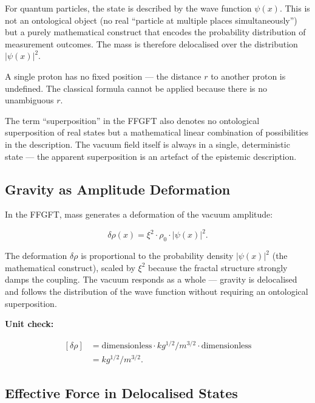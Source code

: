 	For quantum particles, the state is described by the wave function \(\psi(x)\). This is not an ontological object (no real “particle at multiple places simultaneously”) but a purely mathematical construct that encodes the probability distribution of measurement outcomes. The mass is therefore delocalised over the distribution \(|\psi(x)|^2\).
	
	A single proton has no fixed position — the distance \(r\) to another proton is undefined. The classical formula cannot be applied because there is no unambiguous \(r\).
	
	The term “superposition” in the FFGFT also denotes no ontological superposition of real states but a mathematical linear combination of possibilities in the description. The vacuum field itself is always in a single, deterministic state — the apparent superposition is an artefact of the epistemic description.
	
	\subsection*{Gravity as Amplitude Deformation}
	
	In the FFGFT, mass generates a deformation of the vacuum amplitude:
	
	\begin{equation}
		\delta \rho(x) = \xi^2 \cdot \rho_0 \cdot |\psi(x)|^2.
	\end{equation}
	
	The deformation \(\delta \rho\) is proportional to the probability density \(|\psi(x)|^2\) (the mathematical construct), scaled by \(\xi^2\) because the fractal structure strongly damps the coupling. The vacuum responds as a whole — gravity is delocalised and follows the distribution of the wave function without requiring an ontological superposition.
	
	\textbf{Unit check:}
	
     \begin{equation}
	\begin{aligned}
		[\delta \rho]
		&= \text{dimensionless}
		\cdot \si{kg^{1/2}/m^{3/2}}
		\cdot \text{dimensionless} \\
		&= \si{kg^{1/2}/m^{3/2}}.
	\end{aligned}
\end{equation}
	
	\subsection*{Effective Force in Delocalised States}
	
